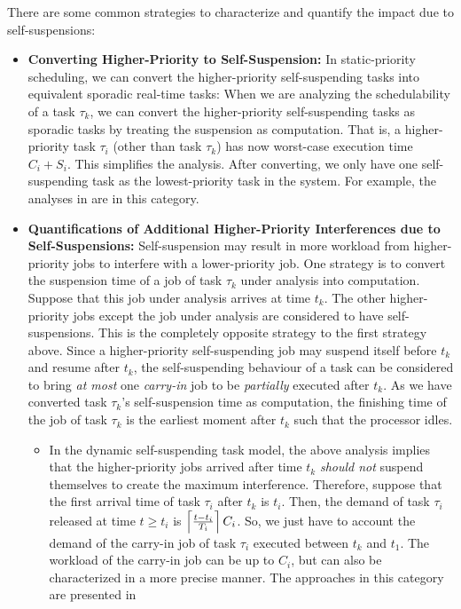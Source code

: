 There are some common strategies to characterize and quantify the impact due to self-suspensions:
\begin{itemize}
\item {\bf Converting Higher-Priority to Self-Suspension:} In static-priority scheduling, we can convert the higher-priority self-suspending tasks into equivalent sporadic real-time tasks: When we are analyzing the schedulability of a task $\tau_k$, we can convert the higher-priority self-suspending tasks as sporadic tasks by treating the suspension as computation. That is, a higher-priority task $\tau_i$ (other than task $\tau_k$) has now worst-case execution time $C_i+S_i$. This simplifies the analysis. After converting, we only have one self-suspending task as the lowest-priority task in the system. For example, the analyses in \cite{LR:rtas10,ecrts15nelissen} are in this category.
\item {\bf Quantifications of Additional Higher-Priority Interferences due to Self-Suspensions:} Self-suspension may result in more workload from higher-priority jobs to interfere with a lower-priority job. One strategy is to convert the suspension time of a job of task $\tau_k$ under analysis into computation. Suppose that this job under analysis arrives at time $t_k$. The other higher-priority jobs except the job under analysis are considered to have self-suspensions. This is the completely opposite strategy to the first strategy above. Since a higher-priority self-suspending job may suspend itself before $t_k$ and resume after $t_k$, the self-suspending behaviour of a task can be considered to bring \emph{at most} one \emph{carry-in} job to be \emph{partially} executed after $t_k$. As we have converted task $\tau_k$'s self-suspension time as computation, the finishing time of the job of task $\tau_k$ is the earliest moment after $t_k$ such that the processor idles. 
\begin{itemize}
\item In the dynamic self-suspending task model, the above analysis implies that the higher-priority jobs arrived after time $t_k$ \emph{should not} suspend themselves to create the maximum interference. Therefore, suppose that the first arrival time of task $\tau_i$ after $t_k$ is $t_i$. Then, the demand of task $\tau_i$ released at time $t \geq t_i$ is $\left\lceil{\frac{t-t_i}{T_i} }\right\rceil C_i$. So, we just have to account the demand of the carry-in job of task $\tau_i$ executed between $t_k$ and $t_1$. The workload of the carry-in job can be up to $C_i$, but can also be characterized in a more precise manner. The approaches in this category are presented in \cite{huangpass:dac2015,LiuChen:rtss2014}
\end{itemize}
\end{itemize}


